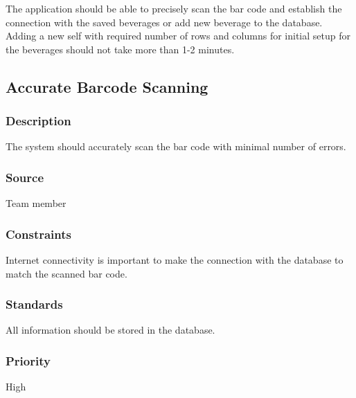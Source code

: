 The application should be able to precisely scan the bar code and establish the connection with the saved beverages or add new beverage to the database. Adding a new self with required number of rows and columns for initial setup for the beverages should not take more than 1-2 minutes. 

\subsection{Accurate Barcode Scanning}
\subsubsection{Description}
The system should accurately scan the bar code with minimal number of errors.
\subsubsection{Source}
Team member
\subsubsection{Constraints}
Internet connectivity is important to make the connection with the database to match the scanned bar code. 
\subsubsection{Standards}
All information should be stored in the database. 
\subsubsection{Priority}
High

